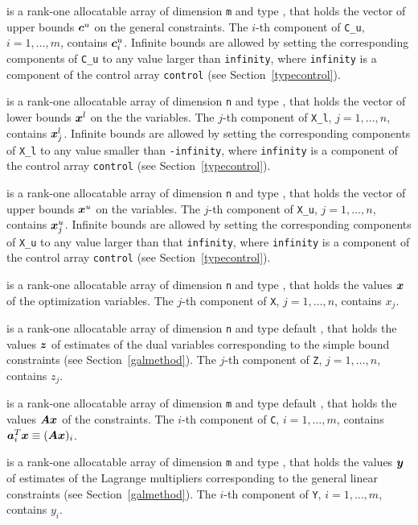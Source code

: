 \documentclass{galahad}
\begin{document}
\begin{description}
 is a rank-one allocatable array of dimension {\tt m} and type 
\realdp, that holds the vector of upper bounds ${\bm{c}}^{u}$ 
on the general constraints. The $i$-th component of 
{\tt C\_u}, $i = 1,  \ldots ,  m$, contains ${\bm{c}}_{i}^{u}$.
Infinite bounds are allowed by setting the corresponding 
components of {\tt C\_u} to any value larger than {\tt infinity}, 
where {\tt infinity} is a component of the control array {\tt control} 
(see Section~\ref{typecontrol}).

 is a rank-one allocatable array of dimension {\tt n} and type 
\realdp, that holds
the vector of lower bounds ${\bm{x}}^{l}$ on the the variables.
The $j$-th component of {\tt X\_l}, $j = 1, \ldots , n$, 
contains ${\bm{x}}_{j}^{l}$.
Infinite bounds are allowed by setting the corresponding 
components of {\tt X\_l} to any value smaller than {\tt -infinity}, 
where {\tt infinity} is a component of the control array {\tt control} 
(see Section~\ref{typecontrol}).

 is a rank-one allocatable array of dimension {\tt n} and type 
\realdp, that holds
the vector of upper bounds ${\bm{x}}^{u}$ on the variables.
The $j$-th component of {\tt X\_u}, $j = 1, \ldots , n$, 
contains ${\bm{x}}_{j}^{u}$.
Infinite bounds are allowed by setting the corresponding 
components of {\tt X\_u} to any value larger than that {\tt infinity}, 
where {\tt infinity} is a component of the control array {\tt control} 
(see Section~\ref{typecontrol}).

 is a rank-one allocatable array of dimension {\tt n} and type 
\realdp, 
that holds the values ${\bm{x}}$ of the optimization variables.
The $j$-th component of {\tt X}, $j = 1,  \ldots , n$, contains $x_{j}$.  

 is a rank-one allocatable array of dimension {\tt n} and type default 
\realdp, that holds
the values ${\bm{z}}$ of estimates  of the dual variables 
corresponding to the simple bound constraints (see Section~\ref{galmethod}).
The $j$-th component of {\tt Z}, $j = 1,  \ldots ,  n$, contains $z_{j}$.  

 is a rank-one allocatable array of dimension {\tt m} and type default 
\realdp, that holds
the values ${\bm{A}} {\bm{x}}$ of the constraints.
The $i$-th component of {\tt C}, $i = 1,  \ldots ,  m$, contains 
${\bm{a}}_{i}^{T}{\bm{x}} \equiv ({\bm{A}} {\bm{x}})_{i}$.  

 is a rank-one allocatable array of dimension {\tt m} and type 
\realdp, that holds
the values ${\bm{y}}$ of estimates  of the Lagrange multipliers
corresponding to the general linear constraints (see Section~\ref{galmethod}).
The $i$-th component of {\tt Y}, $i = 1,  \ldots ,  m$, contains $y_{i}$.  

\end{description}
\end{document}
